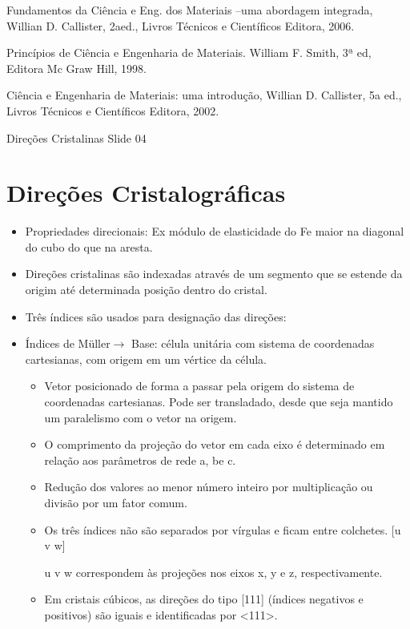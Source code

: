 Fundamentos da Ciência e Eng. dos Materiais –uma abordagem integrada, Willian D. Callister, 2aed., Livros Técnicos e Científicos Editora, 2006.

Princípios de Ciência e Engenharia de Materiais. William F. Smith, 3ª ed, Editora Mc Graw Hill, 1998.

Ciência e Engenharia de Materiais: uma introdução, Willian D. Callister, 5a ed., Livros Técnicos e Científicos Editora, 2002.



{\large Direções Cristalinas Slide 04}

\section{Direções Cristalográficas}

\begin{itemize}
	\item Propriedades direcionais: Ex módulo de elasticidade do Fe maior na diagonal do cubo do que na aresta.
	\item Direções cristalinas são indexadas através de um segmento que se estende da origim até determinada posição dentro do cristal.
	\item Três índices são usados para designação das direções:

\end{itemize}


\begin{itemize}
	\item Índices de Müller$\rightarrow$ Base: célula unitária com sistema de coordenadas cartesianas, com origem em um vértice da célula.
	\begin{itemize}
		\item Vetor posicionado de forma a passar pela origem do sistema de coordenadas cartesianas. Pode ser transladado, desde que seja mantido um paralelismo com o vetor na origem.
		\item O comprimento da projeção do vetor em cada eixo é determinado em relação aos parâmetros de rede a, be c.
		\item Redução dos valores ao menor número inteiro por multiplicação ou divisão por um fator comum.
		\item Os três índices não são separados por vírgulas e ficam entre colchetes. [u v w]
		\item [u v w] correspondem às projeções nos eixos x, y e z, respectivamente.
	 	\item Em cristais cúbicos, as direções do tipo [111] (índices negativos e positivos) são iguais e identificadas por <111>.
	\end{itemize}	
\end{itemize}

